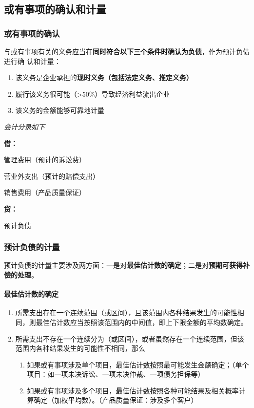 \documentclass[UTF8,12pt]{ctexart}
\newenvironment{Dr}{%
	\begin{list}{}%
		{
			\setlength{\leftmargin}{2em}
			\setlength{\labelwidth}{2em}
			\setlength{\labelsep}{0pt}
			\setlength{\itemindent}{0pt}
			\setlength{\listparindent}{0pt}
			\setlength{\parsep}{0pt}
			\setlength{\topsep}{0pt}
		}
		\item[\textbf{借：}]
	}{%
	\end{list}
}
\newenvironment{Cr}{%
	\begin{list}{}%
		{
			\setlength{\leftmargin}{2em}
			\setlength{\labelwidth}{2em}
			\setlength{\labelsep}{0pt}
			\setlength{\itemindent}{0pt}
			\setlength{\listparindent}{0pt}
			\setlength{\parsep}{0pt}
			\setlength{\topsep}{0pt}
		}
		\item[\textbf{贷：}]
	}{%
	\end{list}
}
\numberwithin{equation}{section} %
\numberwithin{figure}{section}
\numberwithin{table}{section}
\begin{document}
	\subsection{或有事项的确认和计量}
	\subsubsection{或有事项的确认}
	与或有事项有关的义务应当在\textbf{同时符合以下三个条件时确认为负债}，作为预计负债进行确  认和计量：
	\begin{enumerate}
		\item 该义务是企业承担的\textbf{现时义务（包括法定义务、推定义务）}
		
		\item 履行该义务很可能（>50\%）导致经济利益流出企业
		
		\item 该义务的金额能够可靠地计量
	\end{enumerate}
	
	\textit{会计分录如下}
	
	\begin{Dr}
		管理费用（预计的诉讼费）
		
		营业外支出（预计的赔偿支出） 
		
		销售费用（产品质量保证）
	\end{Dr}
	\begin{Cr}
		预计负债
	\end{Cr}
	
	\subsubsection{预计负债的计量}
	预计负债的计量主要涉及两方面：一是对\textbf{最佳估计数的确定}；二是对\textbf{预期可获得补偿的处理}。
	
	\paragraph{最佳估计数的确定}
	\begin{enumerate}
		\item 所需支出存在一个连续范围（或区间），且该范围内各种结果发生的可能性相同，则最佳估计数应当按照该范围内的中间值，即上下限金额的平均数确定。
		
		\item 所需支出不存在一个连续分为（或区间），或者虽然存在一个连续范围，但该范围内各种结果发生的可能性不相同，那么
		\begin{enumerate}
			\item 如果或有事项涉及单个项目，最佳估计数按照最可能发生金额确定；（单个项目：如一项未决诉讼、一项未决仲裁、一项债务担保等）
			
			\item 如果或有事项涉及多个项目，最佳估计数按照各种可能结果及相关概率计算确定（加权平均数）。（产品质量保证：涉及多个客户）
		\end{enumerate}
	\end{enumerate}
	
\end{document}
